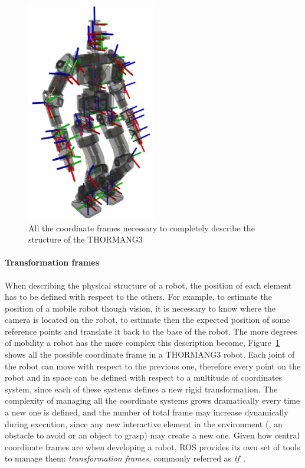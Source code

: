 \begin{figure}[t]
    \centering
    \includegraphics[width=0.5\textwidth]{gfx/ros/tf_frames}
    \caption{All the coordinate frames necessary to completely describe the structure of the THORMANG3}\label{fig:ros-tf}
\end{figure}

\paragraph{Transformation frames} When describing the physical structure of a robot, the position of each element has to be defined with respect to the others. For example, to estimate the position of a mobile robot though vision, it is necessary to know where the camera is located on the robot, to estimate then the expected position of some reference points and translate it back to the base of the robot. The more degrees of mobility a robot has the more complex this description become, Figure~\ref{fig:ros-tf} shows all the possible coordinate frame in a THORMANG3 robot. Each joint of the robot can move with respect to the previous one, therefore every point on the robot and in space can be defined with respect to a multitude of coordinates system, since each of these systems defines a new rigid transformation. The complexity of managing all the coordinate systems grows dramatically every time a new one is defined, and the number of total frame may increase dynamically during execution, since any new interactive element in the environment (\eg, an obstacle to avoid or an object to grasp)  may create a new one. Given how central coordinate frames are when developing a robot, ROS provides its own set of tools to manage them: \textit{transformation frames}, commonly referred as \textit{tf}~\cite{foote2013tf}.

